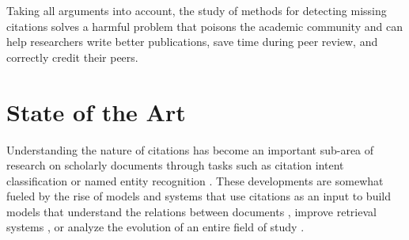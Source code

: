 \documentclass[12pt,a4paper]{report}
\begin{document}
Taking all arguments into account, the study of methods for detecting missing citations solves a harmful problem that poisons the academic community and can help researchers write better publications, save time during peer review, and correctly credit their peers. 

\chapter{State of the Art} \label{sota}



Understanding the nature of citations has become an important sub-area of research on scholarly documents through tasks such as citation intent classification \cite{Cohan2019StructuralSF} or named entity recognition \cite{luan-etal-2018-multi}. These developments are somewhat fueled by the rise of models and systems that use citations as an input to build models that understand the relations between documents \cite{caciularu-etal-2021-cdlm-cross}, improve retrieval systems \cite{lala2023paperqa}, or analyze the evolution of an entire field of study \cite{Jurgens2018MeasuringTE}.
\end{document}
